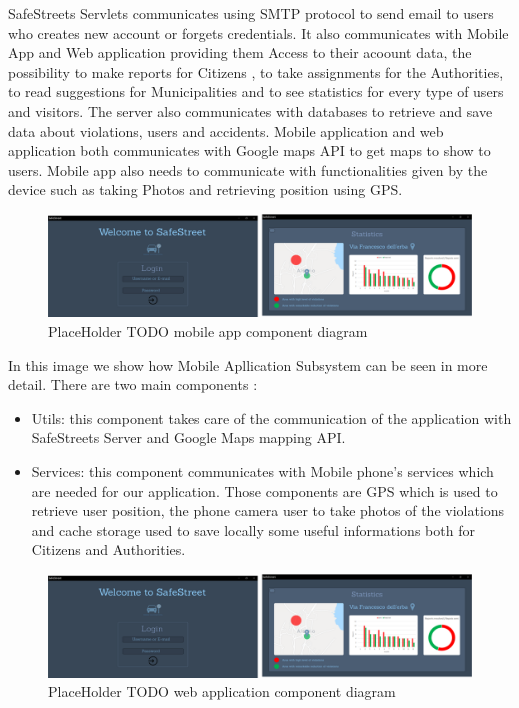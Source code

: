 SafeStreets Servlets communicates using SMTP protocol to send email to users who creates new account or forgets credentials. It also communicates with Mobile App and Web application providing them Access to their acoount data, the possibility to make reports for Citizens , to take assignments for the Authorities, to read suggestions for Municipalities and to see statistics for every type of users and visitors.
The server also communicates with databases to retrieve and save data about violations, users and accidents.
Mobile application and web application both communicates with Google maps API  to get maps to show to users. Mobile app also needs to communicate with functionalities given by the device such as taking Photos and retrieving position using GPS.
\newline
\begin{figure}[h]
\centering
\includegraphics[width=\textwidth]{Images/desktop_common_interface.png}
\caption{\label{fig:ComWI}PlaceHolder TODO mobile app component diagram}
\end{figure}
In this image we show how Mobile Apllication Subsystem can be seen in more detail.
There are two main components : 
\begin{itemize}
\item Utils:  this component takes care of the communication of the application with SafeStreets Server and Google Maps mapping API.
\item Services: this component communicates with Mobile phone's services which are needed for our application. Those components are GPS which is used to retrieve user position, the phone camera user to take photos of the violations and cache storage used to save locally some useful informations both for Citizens and Authorities.
\end{itemize}
\begin{figure}[h]
\centering
\includegraphics[width=\textwidth]{Images/desktop_common_interface.png}
\caption{\label{fig:ComWI}PlaceHolder TODO web application component diagram}
\end{figure}
